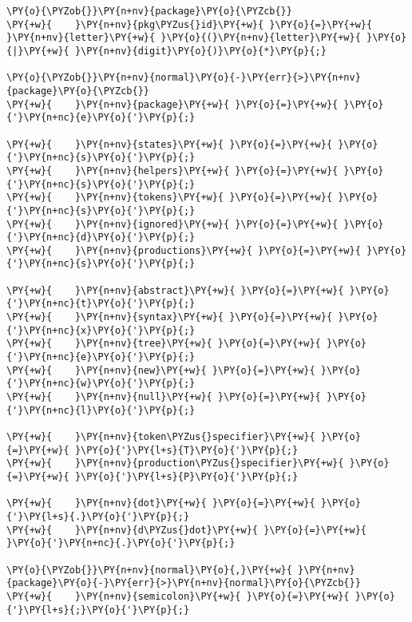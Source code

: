 \begin{Verbatim}[commandchars=\\\{\}]
\PY{o}{\PYZob{}}\PY{n+nv}{package}\PY{o}{\PYZcb{}}
\PY{+w}{    }\PY{n+nv}{pkg\PYZus{}id}\PY{+w}{ }\PY{o}{=}\PY{+w}{ }\PY{n+nv}{letter}\PY{+w}{ }\PY{o}{(}\PY{n+nv}{letter}\PY{+w}{ }\PY{o}{|}\PY{+w}{ }\PY{n+nv}{digit}\PY{o}{)}\PY{o}{*}\PY{p}{;}

\PY{o}{\PYZob{}}\PY{n+nv}{normal}\PY{o}{-}\PY{err}{>}\PY{n+nv}{package}\PY{o}{\PYZcb{}}
\PY{+w}{    }\PY{n+nv}{package}\PY{+w}{ }\PY{o}{=}\PY{+w}{ }\PY{o}{'}\PY{n+nc}{e}\PY{o}{'}\PY{p}{;}

\PY{+w}{    }\PY{n+nv}{states}\PY{+w}{ }\PY{o}{=}\PY{+w}{ }\PY{o}{'}\PY{n+nc}{s}\PY{o}{'}\PY{p}{;}
\PY{+w}{    }\PY{n+nv}{helpers}\PY{+w}{ }\PY{o}{=}\PY{+w}{ }\PY{o}{'}\PY{n+nc}{s}\PY{o}{'}\PY{p}{;}
\PY{+w}{    }\PY{n+nv}{tokens}\PY{+w}{ }\PY{o}{=}\PY{+w}{ }\PY{o}{'}\PY{n+nc}{s}\PY{o}{'}\PY{p}{;}
\PY{+w}{    }\PY{n+nv}{ignored}\PY{+w}{ }\PY{o}{=}\PY{+w}{ }\PY{o}{'}\PY{n+nc}{d}\PY{o}{'}\PY{p}{;}
\PY{+w}{    }\PY{n+nv}{productions}\PY{+w}{ }\PY{o}{=}\PY{+w}{ }\PY{o}{'}\PY{n+nc}{s}\PY{o}{'}\PY{p}{;}

\PY{+w}{    }\PY{n+nv}{abstract}\PY{+w}{ }\PY{o}{=}\PY{+w}{ }\PY{o}{'}\PY{n+nc}{t}\PY{o}{'}\PY{p}{;}
\PY{+w}{    }\PY{n+nv}{syntax}\PY{+w}{ }\PY{o}{=}\PY{+w}{ }\PY{o}{'}\PY{n+nc}{x}\PY{o}{'}\PY{p}{;}
\PY{+w}{    }\PY{n+nv}{tree}\PY{+w}{ }\PY{o}{=}\PY{+w}{ }\PY{o}{'}\PY{n+nc}{e}\PY{o}{'}\PY{p}{;}
\PY{+w}{    }\PY{n+nv}{new}\PY{+w}{ }\PY{o}{=}\PY{+w}{ }\PY{o}{'}\PY{n+nc}{w}\PY{o}{'}\PY{p}{;}
\PY{+w}{    }\PY{n+nv}{null}\PY{+w}{ }\PY{o}{=}\PY{+w}{ }\PY{o}{'}\PY{n+nc}{l}\PY{o}{'}\PY{p}{;}

\PY{+w}{    }\PY{n+nv}{token\PYZus{}specifier}\PY{+w}{ }\PY{o}{=}\PY{+w}{ }\PY{o}{'}\PY{l+s}{T}\PY{o}{'}\PY{p}{;}
\PY{+w}{    }\PY{n+nv}{production\PYZus{}specifier}\PY{+w}{ }\PY{o}{=}\PY{+w}{ }\PY{o}{'}\PY{l+s}{P}\PY{o}{'}\PY{p}{;}

\PY{+w}{    }\PY{n+nv}{dot}\PY{+w}{ }\PY{o}{=}\PY{+w}{ }\PY{o}{'}\PY{l+s}{.}\PY{o}{'}\PY{p}{;}
\PY{+w}{    }\PY{n+nv}{d\PYZus{}dot}\PY{+w}{ }\PY{o}{=}\PY{+w}{ }\PY{o}{'}\PY{n+nc}{.}\PY{o}{'}\PY{p}{;}

\PY{o}{\PYZob{}}\PY{n+nv}{normal}\PY{o}{,}\PY{+w}{ }\PY{n+nv}{package}\PY{o}{-}\PY{err}{>}\PY{n+nv}{normal}\PY{o}{\PYZcb{}}
\PY{+w}{    }\PY{n+nv}{semicolon}\PY{+w}{ }\PY{o}{=}\PY{+w}{ }\PY{o}{'}\PY{l+s}{;}\PY{o}{'}\PY{p}{;}


\end{Verbatim}
